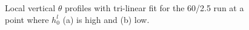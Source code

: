 \documentclass[referee]{svjour3}
\begin{document}
\begin{figure}[htbp]
\begin{minipage}[b]{0.5\linewidth}
        \\
        \end{minipage}             
\quad
\begin{minipage}[b]{0.5\linewidth}
        \\       
       \end{minipage}
\caption[High local ML ]{Local vertical $\theta$ profiles with tri-linear fit for the 60/2.5 run at a point where $h^{l}_{0}$ (a) is high and (b) low.}
\label{fig:rssfitshigh}
\end{figure}
\end{document}
